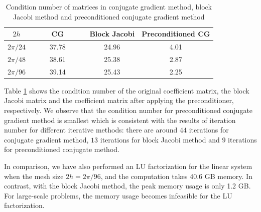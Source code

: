 \begin{table}[htbp]
	\begin{center}
		\begin{tabular}{|c|c c c|}
			\hline
			$2h$   & ~~~~ CG ~~~~& Block Jacobi & Preconditioned CG  \\
			\hline
			$2\pi/24$ &37.78& 24.96& 4.01\\
			\hline
			$2\pi/48$ &38.61 & 25.38 & 2.87\\
			\hline 
			$2\pi/96$ &39.14 &25.43 & 2.25\\
			\hline
		\end{tabular}
	\end{center}
	\caption{Condition number of matrices in conjugate gradient method, block Jacobi method and preconditioned conjugate gradient method}\label{condition_number}
\end{table} 
Table \ref{condition_number} shows the condition number of the original coefficient matrix, the block Jacobi matrix and the coefficient matrix after applying the preconditioner, respectively. We observe that the condition number for preconditioned conjugate gradient method is smallest which is consistent with the results of iteration number for different iterative methods: there are around $44$ iterations for conjugate gradient method, $13$ iterations for block Jacobi method and $9$ iterations for preconditioned conjugate method.

In comparison, we have also performed an LU factorization for the linear system when the mesh size $2h = 2\pi/96$, and the computation takes 40.6 GB memory. In contrast, with the block Jacobi method, the peak memory usage is only 1.2 GB. For large-scale problems, the memory usage becomes infeasible for the LU factorization. 


